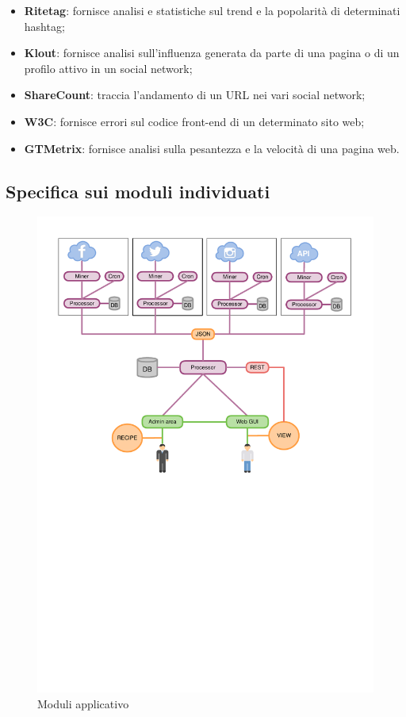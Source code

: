 \begin{itemize}
\begin{itemize}
    \item \textbf{Ritetag}: fornisce analisi e statistiche sul trend e la popolarità di determinati hashtag;
    \item \textbf{Klout}: fornisce analisi sull'influenza generata da parte di una pagina o di un profilo attivo in un social network;
    \item \textbf{ShareCount}: traccia l'andamento di un URL nei vari social network;
    \item \textbf{W3C}: fornisce errori sul codice front-end di un determinato sito web;
    \item \textbf{GTMetrix}: fornisce analisi sulla pesantezza e la velocità di una pagina web.
  \end{itemize}
\end{itemize}

\subsection{Specifica sui moduli individuati}

\begin{figure}[htbp]
    \centering
    \centerline{\includegraphics[scale=0.8]{./images/moduli_bdsmapp.pdf}}
    \caption{Moduli applicativo}
\end{figure}

